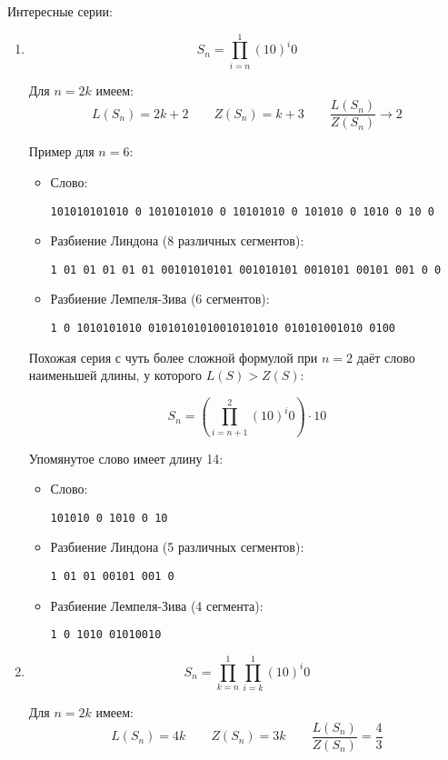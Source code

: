 \documentclass[a4paper]{article}
\begin{document}
Интересные серии:

\begin{enumerate}

\item
    $$ S_n = \prod_{i = n}^{1} (10)^i 0 $$
    
    Для $ n = 2 k $ имеем:
    $$ L(S_n) = 2 k + 2 \qquad Z(S_n) = k + 3 \qquad \frac{L(S_n)}{Z(S_n)} \to 2 $$
    
    Пример для $ n = 6 $:
    
    \begin{itemize}
    \item
        Слово:
        
        \texttt{101010101010 0 1010101010 0 10101010 0 101010 0 1010 0 10 0}
    \item
        Разбиение Линдона (8 различных сегментов):
        
        \texttt{1 01 01 01 01 01 00101010101 001010101 0010101 00101 001 0 0}
    \item
        Разбиение Лемпеля-Зива (6 сегментов):
        
        \texttt{1 0 1010101010 01010101010010101010 010101001010 0100}
    \end{itemize}
    
    Похожая серия с чуть более сложной формулой при $ n = 2 $ даёт слово наименьшей длины, у которого $ L(S) > Z(S) $:
    
    $$ S_n = \left ( \prod_{i = n + 1}^{2} (10)^i 0 \right ) \cdot 10 $$
    
    Упомянутое слово имеет длину 14:
    
    \begin{itemize}
    \item
        Слово:
        
        \texttt{101010 0 1010 0 10}
    \item
        Разбиение Линдона (5 различных сегментов):
        
        \texttt{1 01 01 00101 001 0}
    \item
        Разбиение Лемпеля-Зива (4 сегмента):
        
        \texttt{1 0 1010 01010010}
    \end{itemize}
    
\item
    $$ S_n = \prod_{k = n}^{1} \prod_{i = k}^{1} (10)^i 0 $$
    
    Для $ n = 2 k $ имеем:
    $$ L(S_n) = 4 k \qquad Z(S_n) = 3 k \qquad \frac{L(S_n)}{Z(S_n)} = \frac{4}{3} $$
    

\end{enumerate}
\end{document}
